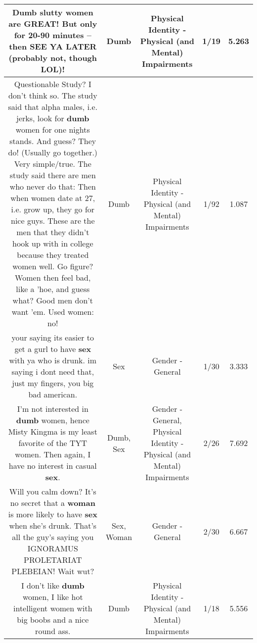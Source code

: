 \documentclass[11pt]{article}
\newlength\mylength
\begin{document}
\begin{center}
\begin{longtable}{|C{.65\mylength}|C{.30\mylength}|C{.12\mylength}|C{.12\mylength}|C{.12\mylength}|}
  \small Dumb slutty women are GREAT!  But only for 20-90 minutes -- then SEE YA LATER (probably not, though LOL)!\normalsize   & Dumb & Physical Identity - Physical (and Mental) Impairments & 1/19 & 5.263 \\  \hline
  \small Questionable Study? I don't think so. The study said that alpha males, i.e. jerks, look for \textbf{dumb} women for one nights stands. And guess?  They do!  (Usually go together.)  Very simple/true.  The study said there are men who never do that: Then when women date at 27, i.e. grow up, they go for nice guys. These are the men that they didn't hook up with in college because they treated women well.  Go figure?  Women then feel bad, like a 'hoe, and guess what? Good men don't want 'em. Used women: no!\normalsize   & Dumb & Physical Identity - Physical (and Mental) Impairments & 1/92 & 1.087 \\  \hline
  \small {} your saying its easier to get a gurl to have \textbf{sex} with ya who is drunk. im saying i dont need that,  just my fingers,  you  big bad american.\normalsize   & Sex & Gender - General & 1/30 & 3.333 \\  \hline
  \small I'm not interested in \textbf{dumb} women, hence Misty Kingma is my least favorite of the TYT women.  Then again, I have no interest in casual \textbf{sex}.\normalsize   & Dumb, Sex & Gender - General, Physical Identity - Physical (and Mental) Impairments & 2/26 & 7.692 \\  \hline
  \small Will you calm down? It's no secret that a \textbf{woman} is more likely to have \textbf{sex} when she's drunk. That's all the guy's saying you IGNORAMUS PROLETARIAT PLEBEIAN! Wait wut?\normalsize   & Sex, Woman & Gender - General & 2/30 & 6.667 \\  \hline
  \small I don't like \textbf{dumb} women, I like hot intelligent women with big boobs and a nice round ass.\normalsize   & Dumb & Physical Identity - Physical (and Mental) Impairments & 1/18 & 5.556 \\  \hline

\end{longtable}
\end{center}
\end{document}
